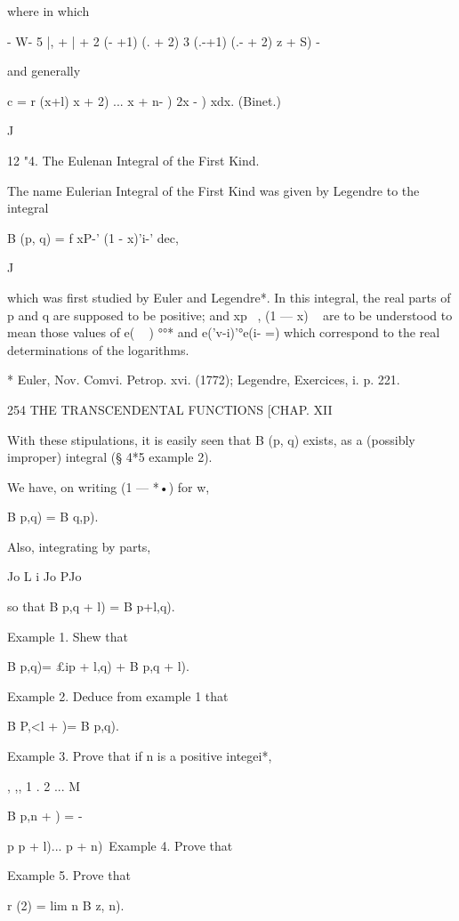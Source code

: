 where 
in which 



-  W- 5 |, + | + 2 (- +1) (.  + 2)   3 (.-+1) (.- + 2)  z + S) - 



and generally 

c = r (x+l)  x + 2) ...  x + n- )   2x - )  xdx. (Binet.) 

J 

12 "4. The Eulenan Integral of the First Kind. 

The name Eulerian Integral of the First Kind was given by Legendre to 
the integral 

B (p, q) = f xP-' (1 - x)'i-' dec, 

J 

which was first studied by Euler and Legendre*. In this integral, the real 
parts of p and q are supposed to be positive; and xp~ , (1 — x) ~  are to be 
understood to mean those values of e( ~ ) °°* and e('v-i)'°e(i- =) which correspond 
to the real determinations of the logarithms. 

* Euler, Nov. Comvi. Petrop. xvi. (1772); Legendre, Exercices, i. p. 221. 



254 THE TRANSCENDENTAL FUNCTIONS [CHAP. XII 

With these stipulations, it is easily seen that B (p, q) exists, as a (possibly 
improper) integral (§ 4*5 example 2). 

We have, on writing (1 — *•) for w, 

B p,q) = B q,p). 

Also, integrating by parts, 

Jo L i  Jo PJo 

so that B p,q + l) =  B p+l,q). 

Example 1. Shew that 

B p,q)= £ip + l,q) + B p,q + l). 

Example 2. Deduce from example 1 that 

B P,<l +  )= B p,q). 

Example 3. Prove that if n is a positive integei*, 

 , ,, 1 . 2 ... M 

B p,n +  )  = - 



p p + l)... p + n)\  
Example 4. Prove that 

Example 5. Prove that 

r (2) = lim n  B  z, n). 

